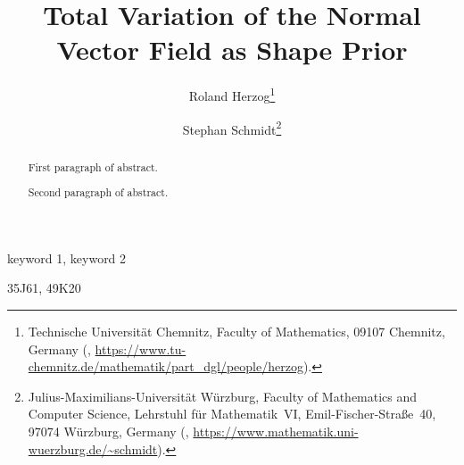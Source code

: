 \documentclass{numapde-preprint}
\title{Total Variation of the Normal Vector Field as Shape Prior}
\subtitle{}
\author{Roland Herzog\thanks{Technische Universität Chemnitz, Faculty of Mathematics, 09107 Chemnitz, Germany
 (\email{roland.herzog@mathematik.tu-chemnitz.de}, \url{https://www.tu-chemnitz.de/mathematik/part_dgl/people/herzog}).}
\and
Stephan Schmidt\thanks{Julius-Maximilians-Universität Würzburg, Faculty of Mathematics and Computer Science, Lehrstuhl für Mathematik~VI, Emil-Fischer-Straße~40, 97074 Würzburg, Germany
 (\email{stephan.schmidt@mathematik.uni-wuerzburg.de}, \url{https://www.mathematik.uni-wuerzburg.de/\~schmidt}).}}
\begin{document}
\maketitle

\begin{abstract}
First paragraph of abstract.

Second paragraph of abstract.
\end{abstract}

\begin{keywords}
	keyword 1, keyword 2
\end{keywords}

\begin{AMS}
	35J61, 49K20
\end{AMS}



\printbibliography
\end{document}
